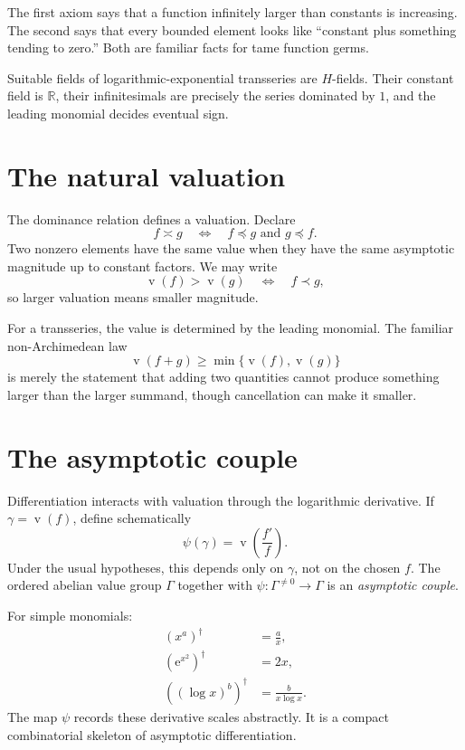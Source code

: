\documentclass[11pt,oneside]{book}
\theoremstyle{definition}
\theoremstyle{remark}
\newcommand{\R}{\mathbb{R}}
\newcommand{\val}{\operatorname{v}}
\newcommand{\e}{\mathrm{e}}
\newcommand{\precdom}{\prec}
\newcommand{\precsimdom}{\preccurlyeq}
\begin{document}
The first axiom says that a function infinitely larger than constants is
increasing. The second says that every bounded element looks like
``constant plus something tending to zero.'' Both are familiar facts for tame
function germs.

Suitable fields of logarithmic-exponential transseries are $H$-fields. Their
constant field is $\R$, their infinitesimals are precisely the series dominated
by $1$, and the leading monomial decides eventual sign.

\section{The natural valuation}

The dominance relation defines a valuation. Declare
\[
  f\asymp g
  \quad\Longleftrightarrow\quad
  f\precsimdom g\text{ and }g\precsimdom f.
\]
Two nonzero elements have the same value when they have the same asymptotic
magnitude up to constant factors. We may write
\[
  \val(f)>\val(g)
  \quad\Longleftrightarrow\quad f\precdom g,
\]
so larger valuation means smaller magnitude.

For a transseries, the value is determined by the leading monomial. The familiar
non-Archimedean law
\[
  \val(f+g)\ge\min\{\val(f),\val(g)\}
\]
is merely the statement that adding two quantities cannot produce something
larger than the larger summand, though cancellation can make it smaller.

\section{The asymptotic couple}

Differentiation interacts with valuation through the logarithmic derivative.
If $\gamma=\val(f)$, define schematically
\begin{equation}
  \psi(\gamma)=\val\left(\frac{f'}{f}\right).
  \label{eq:asymptotic-couple-psi}
\end{equation}
Under the usual hypotheses, this depends only on $\gamma$, not on the chosen
$f$. The ordered abelian value group $\Gamma$ together with
$\psi:\Gamma^{\ne0}\to\Gamma$ is an \emph{asymptotic couple}.

For simple monomials:
\begin{align*}
  (x^a)^\dagger&=\frac{a}{x},\\
  (\e^{x^2})^\dagger&=2x,\\
  ((\log x)^b)^\dagger&=\frac{b}{x\log x}.
\end{align*}
The map $\psi$ records these derivative scales abstractly. It is a compact
combinatorial skeleton of asymptotic differentiation.
\end{document}
